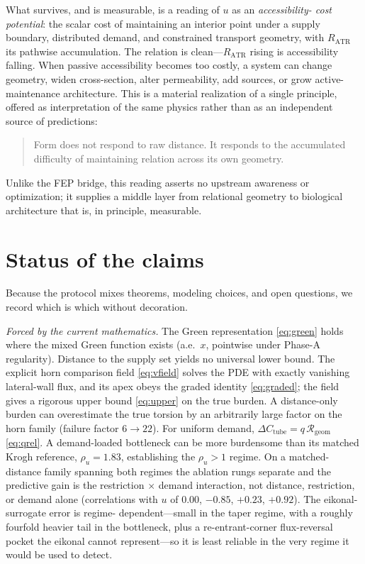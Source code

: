 \documentclass[11pt]{article}
\theoremstyle{remark}
\newcommand{\Rgeom}{\mathcal{R}_{\mathrm{geom}}}
\newcommand{\dCtube}{\Delta C_{\mathrm{tube}}}
\newcommand{\RATR}{R_{\mathrm{ATR}}}
\newcommand{\rhou}{\rho_u}
\begin{document}
What survives, and is measurable, is a reading of $u$ as an \emph{accessibility-
cost potential}: the scalar cost of maintaining an interior point under a supply
boundary, distributed demand, and constrained transport geometry, with $\RATR$ its
pathwise accumulation. The relation is clean---$\RATR$ rising is accessibility
falling. When passive accessibility becomes too costly, a system can change
geometry, widen cross-section, alter permeability, add sources, or grow active-
maintenance architecture. This is a material realization of a single principle,
offered as interpretation of the same physics rather than as an independent source
of predictions:
\begin{quote}
Form does not respond to raw distance. It responds to the accumulated difficulty
of maintaining relation across its own geometry.
\end{quote}
Unlike the FEP bridge, this reading asserts no upstream awareness or optimization;
it supplies a middle layer from relational geometry to biological architecture
that is, in principle, measurable.

\section{Status of the claims}\label{sec:status}

Because the protocol mixes theorems, modeling choices, and open questions, we
record which is which without decoration.

\emph{Forced by the current mathematics.} The Green representation
\eqref{eq:green} holds where the mixed Green function exists (a.e.\ $x$, pointwise
under Phase-A regularity). Distance to the supply set yields no universal lower
bound. The explicit horn comparison field \eqref{eq:vfield} solves the PDE with
exactly vanishing lateral-wall flux, and its apex obeys the graded identity
\eqref{eq:graded}; the field gives a rigorous upper bound \eqref{eq:upper} on the
true burden. A distance-only burden can overestimate the true torsion by an
arbitrarily large factor on the horn family (failure factor $6\to22$). For uniform
demand, $\dCtube=q\,\Rgeom$ \eqref{eq:qrel}. A demand-loaded bottleneck can be more
burdensome than its matched Krogh reference, $\rhou=1.83$, establishing the
$\rhou>1$ regime. On a matched-distance family spanning both regimes the ablation
rungs separate and the predictive gain is the restriction$\,\times\,$demand
interaction, not distance, restriction, or demand alone (correlations with $u$ of
$0.00$, $-0.85$, $+0.23$, $+0.92$). The eikonal-surrogate error is regime-
dependent---small in the taper regime, with a roughly fourfold heavier tail in the
bottleneck, plus a re-entrant-corner flux-reversal pocket the eikonal cannot
represent---so it is least reliable in the very regime it would be used to detect.
\end{document}
